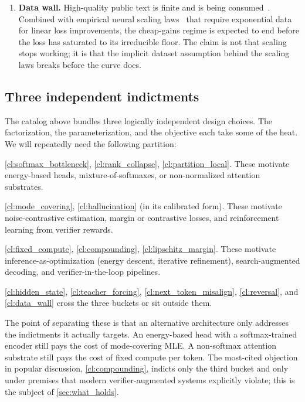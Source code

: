 \begin{enumerate}[label=(E\arabic*),leftmargin=2.5em,start=1]
  \item \label{cl:data_wall}
        \textbf{Data wall.}
        High-quality public text is finite and is being consumed~\citep{villalobos2024position}.
        Combined with empirical neural scaling laws~\citep{kaplan2020scaling,hoffmann2022training} that require exponential data for linear loss improvements, the cheap-gains regime is expected to end before the loss has saturated to its irreducible floor.
        The claim is not that scaling stops working;
        it is that the implicit dataset assumption behind the scaling laws breaks before the curve does.
\end{enumerate}

\subsection{Three independent indictments}
\label{ssec:three_indictments}

The catalog above bundles three logically independent design choices.
The factorization, the parameterization, and the objective each take some of the heat.
We will repeatedly need the following partition:
\begin{description}[leftmargin=1.5em]
  \item[Against the softmax / local normalization:]
        \ref{cl:softmax_bottleneck}, \ref{cl:rank_collapse}, \ref{cl:partition_local}.
        These motivate energy-based heads, mixture-of-softmaxes, or non-normalized attention substrates.
  \item[Against the MLE objective:]
        \ref{cl:mode_covering}, \ref{cl:hallucination} (in its calibrated form).
        These motivate noise-contrastive estimation, margin or contrastive losses, and reinforcement learning from verifier rewards.
  \item[Against autoregressive generation under fixed compute:]
        \ref{cl:fixed_compute}, \ref{cl:compounding}, \ref{cl:lipschitz_margin}.
        These motivate inference-as-optimization (energy descent, iterative refinement), search-augmented decoding, and verifier-in-the-loop pipelines.
\end{description}
\ref{cl:hidden_state}, \ref{cl:teacher_forcing}, \ref{cl:next_token_misalign}, \ref{cl:reversal}, and \ref{cl:data_wall} cross the three buckets or sit outside them.

The point of separating these is that an alternative architecture only addresses the indictments it actually targets.
An energy-based head with a softmax-trained encoder still pays the cost of mode-covering MLE.
A non-softmax attention substrate still pays the cost of fixed compute per token.
The most-cited objection in popular discussion, \ref{cl:compounding}, indicts only the third bucket and only under premises that modern verifier-augmented systems explicitly violate;
this is the subject of \cref{sec:what_holds}.
